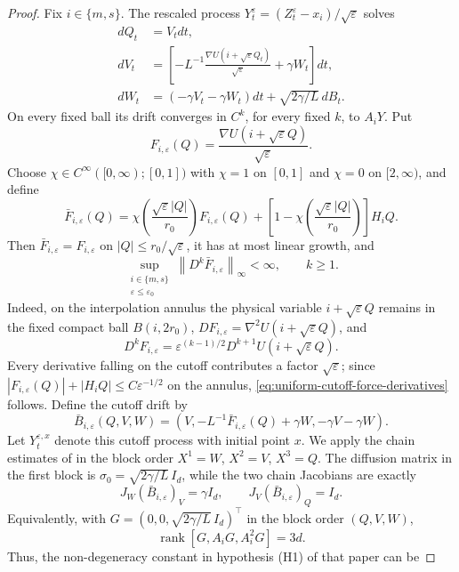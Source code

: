 \documentclass[11pt]{article}
\numberwithin{equation}{section}
\theoremstyle{plain}
\theoremstyle{definition}
\theoremstyle{remark}
\newcommand{\eps}{\varepsilon}
\begin{document}
\begin{proof}
Fix $i\in\{m,s\}$.  The rescaled process
$Y_t^\eps=(Z_t^\eps-x_i)/\sqrt\eps$ solves
\[
\begin{aligned}
dQ_t&=V_tdt,\\
dV_t&=\left[-L^{-1}\frac{\nabla U(i+\sqrt\eps Q_t)}{\sqrt\eps}
              +\gamma W_t\right]dt,\\
dW_t&=(-\gamma V_t-\gamma W_t)dt+\sqrt{2\gamma/L}\,dB_t.
\end{aligned}
\]
On every fixed ball its drift converges in $C^k$, for every fixed $k$, to
$A_iY$.  Put
\[
 F_{i,\eps}(Q)=\frac{\nabla U(i+\sqrt\eps Q)}{\sqrt\eps}.
\]
Choose $\chi\in C^\infty([0,\infty);[0,1])$ with
$\chi=1$ on $[0,1]$ and $\chi=0$ on $[2,\infty)$, and define
\[
\bar F_{i,\eps}(Q)
=\chi\!\left(\frac{\sqrt\eps|Q|}{r_0}\right)F_{i,\eps}(Q)
{}+\left[1-\chi\!\left(\frac{\sqrt\eps|Q|}{r_0}\right)\right]H_iQ.
\]
Then $\bar F_{i,\eps}=F_{i,\eps}$ on $|Q|\le r_0/\sqrt\eps$, it has at most linear
growth, and
\begin{equation}
\label{eq:uniform-cutoff-force-derivatives}
 \sup_{\substack{i\in\{m,s\}\\\eps\le\eps_0}}
 \left\|D^k\bar F_{i,\eps}\right\|_\infty<\infty,
 \qquad k\ge1.
\end{equation}
Indeed, on the interpolation annulus the physical variable
$i+\sqrt\eps Q$ remains in the fixed compact ball $B(i,2r_0)$,
$DF_{i,\eps}=\nabla^2U(i+\sqrt\eps Q)$, and
\[
D^kF_{i,\eps}=\eps^{(k-1)/2}D^{k+1}U\left(i+\sqrt\eps Q\right).  
\]
Every derivative falling
on the cutoff contributes a factor $\sqrt\eps$; since
$|F_{i,\eps}(Q)|+|H_iQ|\le C\eps^{-1/2}$ on the annulus,
\eqref{eq:uniform-cutoff-force-derivatives} follows.
Define the cutoff drift by
\[
 \bar B_{i,\eps}(Q,V,W)
 =\left(V,-L^{-1}\bar F_{i,\eps}(Q)+\gamma W,
              -\gamma V-\gamma W\right).
\]
Let $Y_t^{\eps,x}$ denote this cutoff process with initial point $x$.
We apply the chain estimates of \cite{Pigato2022} in the block order
$X^1=W$, $X^2=V$, $X^3=Q$.  The diffusion matrix in the first block is
$\sigma_0=\sqrt{2\gamma/L}\,I_d$, while the two chain Jacobians are exactly
\[
J_W(\bar B_{i,\eps})_V=\gamma I_d,
\qquad
J_V(\bar B_{i,\eps})_Q=I_d.
\]
Equivalently, with
$G=(0,0,\sqrt{2\gamma/L}\,I_d)^\top$ in the block order $(Q,V,W)$,
\begin{equation}
\label{eq:well-ou-kalman-rank}
\operatorname{rank}\left[G,A_iG,A_i^2G\right]=3d.
\end{equation}
Thus, the non-degeneracy constant in hypothesis (H1) of that paper can be

\end{proof}
\end{document}
